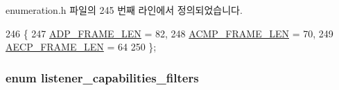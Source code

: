 enumeration.\+h 파일의 245 번째 라인에서 정의되었습니다.


\begin{DoxyCode}
246 \{
247     \hyperlink{openavb__adp__message_8c_aaceb464c58a42bae942421f4c0348710}{ADP\_FRAME\_LEN} = 82,  
248     \hyperlink{openavb__acmp__message_8c_a8395f6fcff3760be8d9e81a56b6882ab}{ACMP\_FRAME\_LEN} = 70, 
249     \hyperlink{openavb__aecp__message_8c_aa79fbe53ba889636a96a256e6e28f6eb}{AECP\_FRAME\_LEN} = 64  
250 \};
\end{DoxyCode}
\subsubsection[{\texorpdfstring{listener\+\_\+capabilities\+\_\+filters}{listener_capabilities_filters}}]{\setlength{\rightskip}{0pt plus 5cm}enum {\bf listener\+\_\+capabilities\+\_\+filters}}\hypertarget{namespaceavdecc__lib_a33513c6f04512c43c67fb5f990c10655}{}\label{namespaceavdecc__lib_a33513c6f04512c43c67fb5f990c10655}
